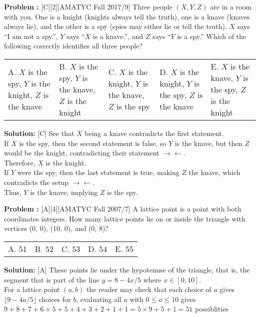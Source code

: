 \documentclass[12pt]{article}
\makeatletter
\newcounter{problem}
\newenvironment{problem}{%
    \stepcounter{problem}
    \noindent\textbf{Problem \theproblem:}%
}{%
    \par
}
\newenvironment{solution}{%
    \vspace{1em} %
    \noindent\textbf{Solution:}%
}{%
    \par
}
\newcommand{\multChoice}[5]{%
    \begin{tabular}{l @{\hskip 1.5cm} l @{\hskip 1.5cm} l @{\hskip 1.5cm} l @{\hskip 1.5cm} l}
    A. #1 & B. #2 & C. #3 & D. #4 & E. #5
\end{tabular}
}
\makeatother
\begin{document}
\begin{problem}[C][2][AMATYC Fall 2017/9]
Three people $(X, Y, Z)$ are in a room with you. One is a knight (knights always tell the
truth), one is a knave (knaves always lie), and the other is a spy (spies may either lie or tell the truth). $X$ says “I am not a spy.”, $Y$ says “$X$ is a knave.”, and $Z$ says “$Y$ is a spy.” Which
of the following correctly identifies all three people? 
\begin{center}
   \begin{tabular}{l @{\hskip 1.5cm} l @{\hskip 1.5cm} l @{\hskip 1.5cm} l @{\hskip 1.5cm} l}
       A. $X$ is the spy, $Y$ is the knight, $Z$ is the knave & 
       B. $X$ is the spy, $Y$ is the knave, $Z$ is the knight & 
       C. $X$ is the knight, $Y$ is the knave, $Z$ is the spy & 
       D. $X$ is the knight, $Y$ is the spy, $Z$ is the knave & 
       E. $X$ is the knave, $Y$ is the spy, $Z$ is the knight 
   \end{tabular}
   \end{center}
\end{problem}



\begin{solution}[C]
See that $X$ being a knave contradicts the first statement. \\
If $X$ is the spy, then the second statement is false, so $Y$ is the knave, but then $Z$ would be the knight, contradicting their statement $\rightarrow \leftarrow$. \\
Therefore, $X$ is the knight. \\
If $Y$ were the spy, then the last statement is true, making $Z$ the knave, which contradicts the setup $\rightarrow \leftarrow$. \\
Thus, $Y$ is the knave, implying $Z$ is the spy. 
\end{solution}

\begin{problem}[A][4][AMATYC Fall 2007/7]
   A lattice point is a point with both coordinates integers. How many lattice points
    lie on or inside the triangle with vertices (0, 0), (10, 0), and (0, 8)?
    \multChoice{51}{52}{53}{54}{55}
\end{problem}

\begin{solution}[A]
   These points lie under the hypotenuse of the triangle, that is, the segment that is part of the line $y=8-4x/5$ where $x \in [0,10]$.\\ For a lattice point $(a,b)$ the reader may check that each choice of $a$ gives $ \lfloor 9-4a/5 \rfloor$ choices for $b$, evaluating all $a$ with $0 \leq a \leq 10$ gives \\
    $9+8+7+6+5+5+4+3+2+1+1 = 5 \times 9 + 5 + 1 = 51$ possiblities
\end{solution}
\end{document}
